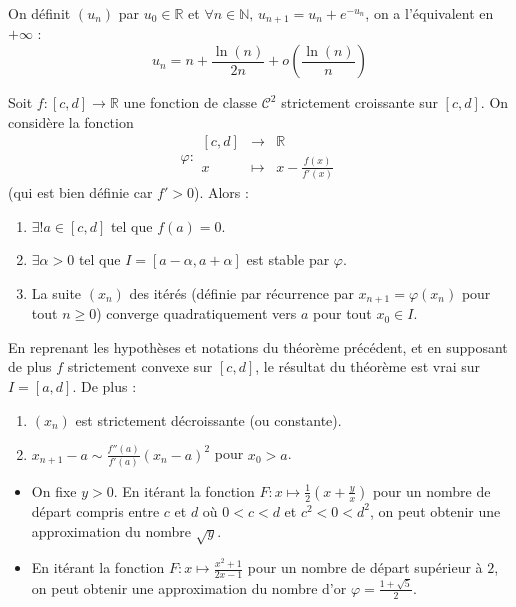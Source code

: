 	
	\begin{example}
		On définit $(u_n)$ par $u_0 \in \mathbb{R}$ et $\forall n \in \mathbb{N}, \, u_{n+1} = u_n + e^{-u_n}$, on a l'équivalent en $+\infty$ :
		\[ u_n = n + \frac{\ln(n)}{2n} + o\left( \frac{\ln(n)}{n} \right) \]
	\end{example}
	
	
	\begin{theorem}
		Soit $f : [c, d] \rightarrow \mathbb{R}$ une fonction de classe $\mathcal{C}^2$ strictement croissante sur $[c, d]$. On considère la fonction
		\[ \varphi :
		\begin{array}{ccc}
			[c, d] &\rightarrow& \mathbb{R} \\
			x &\mapsto& x - \frac{f(x)}{f'(x)}
		\end{array}
		\]
		(qui est bien définie car $f' > 0$). Alors :
		\begin{enumerate}[label=(\roman*)]
			\item $\exists! a \in [c, d]$ tel que $f(a) = 0$.
			\item $\exists \alpha > 0$ tel que $I = [a - \alpha, a + \alpha]$ est stable par $\varphi$.
			\item La suite $(x_n)$ des itérés (définie par récurrence par $x_{n+1} = \varphi(x_n)$ pour tout $n \geq 0$) converge quadratiquement vers $a$ pour tout $x_0 \in I$.
		\end{enumerate}
	\end{theorem}
	
	\begin{corollary}
		En reprenant les hypothèses et notations du théorème précédent, et en supposant de plus $f$ strictement convexe sur $[c, d]$, le résultat du théorème est vrai sur $I = [a, d]$. De plus :
		\begin{enumerate}[label=(\roman*)]
			\item $(x_n)$ est strictement décroissante (ou constante).
			\item $x_{n+1} - a \sim \frac{f''(a)}{f'(a)} (x_n - a)^2$ pour $x_0 > a$.
		\end{enumerate}
	\end{corollary}
	
	\begin{example}
		\begin{itemize}
			\item On fixe $y > 0$. En itérant la fonction $F : x \mapsto \frac{1}{2} \left( x + \frac{y}{x} \right)$ pour un nombre de départ compris entre $c$ et $d$ où $0 < c < d$ et $c^2 < 0 < d^2$, on peut obtenir une approximation du nombre $\sqrt{y}$.
			\item En itérant la fonction $F : x \mapsto \frac{x^2+1}{2x-1}$ pour un nombre de départ supérieur à $2$, on peut obtenir une approximation du nombre d'or $\varphi = \frac{1+\sqrt{5}}{2}$.
		\end{itemize}
	\end{example}
	
